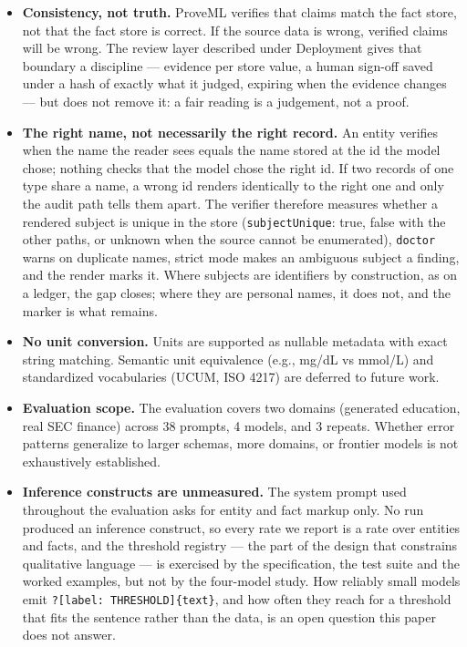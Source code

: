 \documentclass[11pt,a4paper]{article}
\begin{document}
\begin{itemize}[nosep]
    \item \textbf{Consistency, not truth.} ProveML verifies that claims match the fact store, not that the fact store is correct. If the source data is wrong, verified claims will be wrong. The review layer described under Deployment gives that boundary a discipline --- evidence per store value, a human sign-off saved under a hash of exactly what it judged, expiring when the evidence changes --- but does not remove it: a fair reading is a judgement, not a proof.
    \item \textbf{The right name, not necessarily the right record.} An entity verifies when the name the reader sees equals the name stored at the id the model chose; nothing checks that the model chose the right id. If two records of one type share a name, a wrong id renders identically to the right one and only the audit path tells them apart. The verifier therefore measures whether a rendered subject is unique in the store (\texttt{subjectUnique}: true, false with the other paths, or unknown when the source cannot be enumerated), \texttt{doctor} warns on duplicate names, strict mode makes an ambiguous subject a finding, and the render marks it. Where subjects are identifiers by construction, as on a ledger, the gap closes; where they are personal names, it does not, and the marker is what remains.
    \item \textbf{No unit conversion.} Units are supported as nullable metadata with exact string matching. Semantic unit equivalence (e.g., mg/dL vs mmol/L) and standardized vocabularies (UCUM, ISO 4217) are deferred to future work.
    \item \textbf{Evaluation scope.} The evaluation covers two domains (generated education, real SEC finance) across 38 prompts, 4 models, and 3 repeats. Whether error patterns generalize to larger schemas, more domains, or frontier models is not exhaustively established.
    \item \textbf{Inference constructs are unmeasured.} The system prompt used throughout the evaluation asks for entity and fact markup only. No run produced an inference construct, so every rate we report is a rate over entities and facts, and the threshold registry --- the part of the design that constrains qualitative language --- is exercised by the specification, the test suite and the worked examples, but not by the four-model study. How reliably small models emit \texttt{?[label: THRESHOLD]\{text\}}, and how often they reach for a threshold that fits the sentence rather than the data, is an open question this paper does not answer.

\end{itemize}
\end{document}
